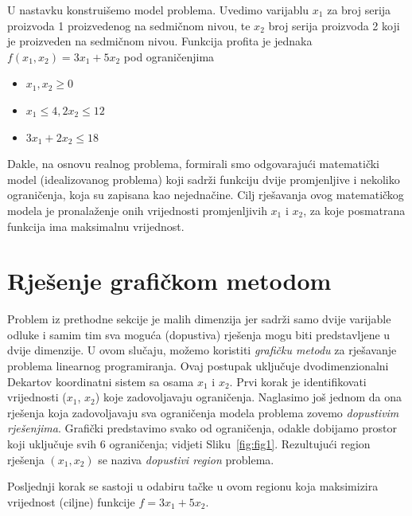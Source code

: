 \documentclass[a4paper, utf8, 11pt, colorlinks]{book}
\begin{document}
U nastavku konstruišemo model problema. Uvedimo varijablu $x_1$ za broj serija proizvoda 1 proizvedenog na sedmičnom nivou, te $x_2$ broj serija proizvoda 2 koji je proizveden na sedmičnom nivou. Funkcija profita je jednaka $f(x_1, x_2) = 3 x_1 + 5 x_2$ pod ograničenjima
\begin{itemize}
    \item $x_1, x_2 \geq 0$
    \item  $x_1 \leq 4, 2 x_2 \leq 12$
    \item $3 x_1 + 2 x_2 \leq 18$
\end{itemize}

Dakle, na osnovu realnog problema, formirali smo odgovarajući matematički model (idealizovanog problema) koji sadrži funkciju dvije promjenljive i nekoliko ograničenja, koja su zapisana kao nejednačine. Cilj rješavanja ovog matematičkog modela je pronalaženje onih vrijednosti promjenljivih $x_1$ i $x_2$, za koje posmatrana funkcija ima maksimalnu vrijednost.

\section{Rješenje grafičkom metodom}
 Problem iz prethodne sekcije je malih dimenzija jer sadrži samo dvije varijable odluke i samim tim sva moguća (dopustiva) rješenja mogu biti predstavljene u dvije dimenzije. U ovom slučaju, možemo koristiti \emph{grafičku metodu} za rješavanje problema linearnog programiranja. Ovaj postupak uključuje dvodimenzionalni Dekartov koordinatni sistem sa osama $x_1$ i $x_2$.  Prvi korak je identifikovati vrijednosti ($x_1$, $x_2$) koje zadovoljavaju ograničenja. Naglasimo još jednom da ona rješenja koja zadovoljavaju sva ograničenja modela  problema zovemo \emph{dopustivim rješenjima}. Grafički predstavimo svako od ograničenja, odakle dobijamo prostor koji uključuje svih 6 ograničenja; vidjeti Sliku~\ref{fig:fig1}.  Rezultujući region rješenja $(x_1, x_2)$ se naziva \emph{dopustivi region} problema.
 
 Posljednji korak se sastoji u odabiru tačke u ovom regionu  koja maksimizira vrijednost (ciljne) funkcije $f = 3x_1 + 5x_2$. 
\end{document}
